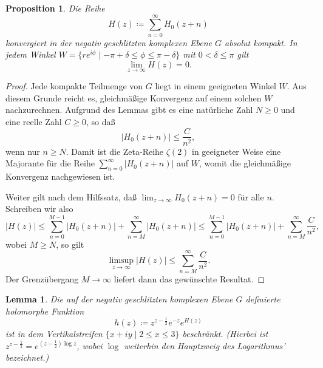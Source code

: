\documentclass[a4paper,twoside,openright]{report}
\newtheorem{prop}[thm]{Proposition}
\newtheorem{lem}[thm]{Lemma}
\theoremstyle{definition}
\theoremstyle{remark}
\begin{document}
\begin{prop}
  Die Reihe
  \[
    H(z) \coloneqq \sum_{n = 0}^\infty H_0(z + n)
  \]
  konvergiert in der negativ geschlitzten komplexen Ebene $G$ absolut kompakt. In jedem
  Winkel $W = \{r e^{i \phi} \mid -\pi + \delta \leq \phi \leq \pi - \delta\}$
  mit $0 < \delta \leq \pi$ gilt
  \[
    \lim_{z \to \infty} H(z) = 0.
  \]
\end{prop}

\begin{proof}
  Jede kompakte Teilmenge von $G$ liegt in einem geeigneten Winkel $W$. Aus
  diesem Grunde reicht es, gleichmäßige Konvergenz auf einem solchen $W$
  nachzurechnen. Aufgrund des Lemmas gibt es eine natürliche Zahl $N \ge 0$ und 
  eine reelle Zahl $C \ge 0$, so daß
  \[
    |H_0(z + n)| \leq \frac C{n^2},
  \]
  wenn nur $n \ge N$. Damit ist die Zeta-Reihe $\zeta(2)$ in geeigneter Weise
  eine Majorante für die Reihe $\sum_{n = 0}^\infty |H_0(z + n)|$ auf $W$,
  womit die gleichmäßige Konvergenz nachgewiesen ist.

  Weiter gilt nach dem Hilfssatz, daß $\lim_{z \to \infty} H_0(z + n) = 0$ für alle $n$.
  Schreiben wir also
  \[
    |H(z)| \leq \sum_{n = 0}^{M - 1} |H_0(z + n)| + \sum_{n = M}^\infty |H_0(z + n)|
    \leq \sum_{n = 0}^{M - 1} |H_0(z + n)| + \sum_{n = M}^\infty \frac C {n^2},
  \]
  wobei $M \ge N$, so gilt
  \[
    \limsup_{z \to \infty} |H(z)| \leq \sum_{n = M}^\infty \frac C{n^2}.
  \]
  Der Grenzübergang $M \to \infty$ liefert dann das gewünschte Resultat.
\end{proof}

\begin{lem}
  Die auf der negativ geschlitzten komplexen Ebene $G$ definierte
  holomorphe Funktion
  \[
    h(z) \coloneqq z^{z - \frac 1 2} e^{-z} e^{H(z)}
  \]
  ist in dem Vertikalstreifen $\{x + i y \mid 2 \leq x \leq 3\}$ beschränkt.
  (Hierbei ist $z^{z - \frac 1 2} = e^{(z - \frac 1 2) \log z}$, wobei
  $\log$ weiterhin den Hauptzweig des Logarithmus' bezeichnet.)
\end{lem}
\end{document}
